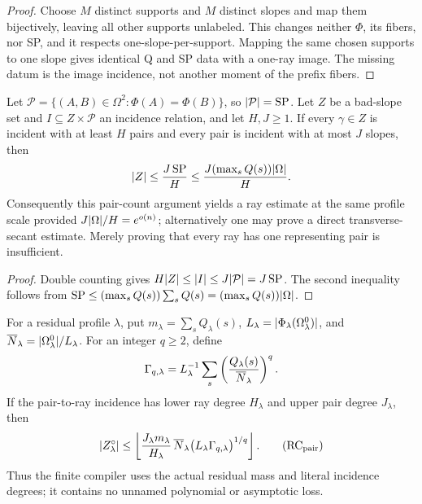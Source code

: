 \documentclass[11pt,a4paper]{amsart}
\numberwithin{equation}{section}
\theoremstyle{remark}
\begin{document}
\begin{proof}
Choose \(M\) distinct supports and \(M\) distinct slopes and map them
bijectively, leaving all other supports unlabeled.  This changes neither
\(\Phi\), its fibers, nor SP, and it respects one-slope-per-support.
Mapping the same chosen supports to one slope gives identical Q and SP
data with a one-ray image.  The missing datum is the image incidence, not
another moment of the prefix fibers.
\end{proof}

\begin{proposition}
\label{prop:pair-ray-multiplicity}
Let
\(\mathcal P=\{(A,B)\in\Omega^2:\Phi(A)=\Phi(B)\}\), so
\(\lvert \mathcal P\rvert={\rm SP}\).  Let \(Z\) be a bad-slope set and
\(I\subseteq Z\times\mathcal P\) an incidence relation, and let
\(H,J\ge1\).  If every
\(\gamma\in Z\) is incident with at least \(H\) pairs and every pair is
incident with at most \(J\) slopes, then
\begin{equation}
 \lvert Z\rvert\le\frac{J\,{\rm SP}}H
       \le\frac{J(\max_sQ(s))\lvert \Omega\rvert}{H}.
 \label{eq:pair-ray-multiplicity}
\end{equation}
Consequently this pair-count argument yields a ray estimate at the same
profile scale provided \(J\lvert \Omega\rvert/H=e^{o(n)}\); alternatively one may
prove a direct transverse-secant estimate.  Merely proving that every ray
has one representing pair is insufficient.
\end{proposition}

\begin{proof}
Double counting gives
\(H\lvert Z\rvert\le\lvert I\rvert\le J\lvert \mathcal P\rvert=J\,{\rm SP}\).  The second
inequality follows from
\({\rm SP}\le(\max_sQ(s))\sum_sQ(s)=(\max_sQ(s))\lvert \Omega\rvert\).
\end{proof}

\begin{corollary}
\label{cor:finite-pair-ray-compiler}
For a residual profile \(\lambda\), put
\(m_\lambda=\sum_sQ_\lambda(s)\),
\(L_\lambda=\lvert \Phi_\lambda(\Omega^0_\lambda)\rvert\), and
\(\overline N_\lambda=\lvert \Omega^0_\lambda\rvert/L_\lambda\).  For an integer
\(q\ge2\), define
\[
 \Gamma_{q,\lambda}=L_\lambda^{-1}\sum_s
 \left(\frac{Q_\lambda(s)}{\overline N_\lambda}\right)^q.
\]
If the pair-to-ray incidence has lower ray degree \(H_\lambda\) and upper
pair degree \(J_\lambda\), then
\[
 \abs{Z_\lambda^\circ}\le
 \floor{\frac{J_\lambda m_\lambda}{H_\lambda}\,
  \barN_\lambda
  \bigl(L_\lambda\Gamma_{q,\lambda}\bigr)^{1/q}}.   \tag{RC$_{\rm pair}$}
\]
Thus the finite compiler uses the actual residual mass and literal
incidence degrees; it contains no unnamed polynomial or asymptotic loss.
\end{corollary}
\end{document}
